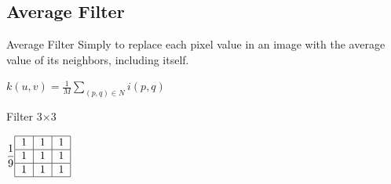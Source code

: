 \documentclass{beamer}
\begin{document}
\subsection{Average Filter}
\begin{frame}{Average Filter}
Simply to replace each pixel value in an image with the average value of its neighbors, including itself.

\begin{center}
$k(u,v) = \frac{1}{M}\displaystyle\sum_{(p,q) \in N} i(p,q)$
\end{center}
\vspace{0.5cm}


\begin{center}


	Filter 3$\times$3
	
	$\dfrac{1}{9}\begin{tabular}{|c|c|c|}
	\hline 
	1 & 1 & 1 \\ 
	\hline 
	1 & 1 & 1 \\ 
	\hline 
	1 & 1 & 1 \\ 
	\hline 
	\end{tabular}$ 	
\end{center}





\end{frame}
\end{document}

